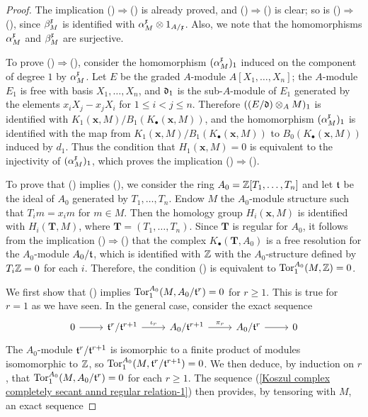 \begin{proof}
The implication ()$\Rightarrow$() is already proved, and ()$\Rightarrow$() is clear; so is ()$\Rightarrow$(), since $\beta_M^{\mathfrak{x}}$ is identified with $\alpha_M^{\mathfrak{x}}\otimes 1_{A/\mathfrak{x}}$. Also, we note that the homomorphisms $\alpha_M^{\mathfrak{x}}$ and $\beta_M^{\mathfrak{x}}$ are surjective.\par
To prove ()$\Rightarrow$(), consider the homomorphism $(\alpha_M^{\mathfrak{x}})_1$ induced on the component of degree $1$ by $\alpha_M^{\mathfrak{x}}$. Let $E$ be the graded $A$-module $A[X_1,\dots,X_n]$; the $A$-module $E_1$ is free with basis $X_1,\dots,X_n$, and $\mathfrak{d}_1$ is the sub-$A$-module of $E_1$ generated by the elements $x_iX_j-x_jX_i$ for $1\leq i<j\leq n$. Therefore $((E/\mathfrak{d})\otimes_AM)_1$ is identified with $K_1(\bm{x},M)/B_1(K_\bullet(\bm{x},M))$, and the homomorphism $(\alpha_M^{\mathfrak{x}})_1$ is identified with the map from $K_1(\bm{x},M)/B_1(K_\bullet(\bm{x},M))$ to $B_0(K_\bullet(\bm{x},M))$ induced by $d_1$. Thus the condition that $H_1(\bm{x},M)=0$ is equivalent to the injectivity of $(\alpha_M^{\mathfrak{x}})_1$, which proves the implication ()$\Rightarrow$().\par
To prove that () implies (), we consider the ring $A_0=\mathbb{Z}[T_1,\dots,T_n]$ and let $\mathfrak{t}$ be the ideal of $A_0$ generated by $T_1,\dots,T_n$. Endow $M$ the $A_0$-module structure such that $T_im=x_im$ for $m\in M$. Then the homology group $H_i(\bm{x},M)$ is identified with $H_i(\bm{T},M)$, where $\bm{T}=(T_1,\dots,T_n)$. Since $\bm{T}$ is regular for $A_0$, it follows from the implication ()$\Rightarrow$() that the complex $K_\bullet(\bm{T},A_0)$ is a free resolution for the $A_0$-module $A_0/\mathfrak{t}$, which is identified with $\mathbb{Z}$ with the $A_0$-structure defined by $T_i\mathbb{Z}=0$ for each $i$. Therefore, the condition () is equivalent to $\mathrm{Tor}_1^{A_0}(M,\mathbb{Z})=0$.\par
We first show that () implies $\mathrm{Tor}_1^{A_0}(M,A_0/\mathfrak{t}^r)=0$ for $r\geq 1$. This is true for $r=1$ as we have seen. In the general case, consider the exact sequence
\begin{equation}\label{Koszul complex completely secant annd regular relation-1}
\begin{tikzcd}
0\ar[r]&\t^r/\t^{r+1}\ar[r,"\iota_r"]&A_0/\t^{r+1}\ar[r,"\pi_r"]&A_0/\t^r\ar[r]&0
\end{tikzcd}
\end{equation}
The $A_0$-module $\mathfrak{t}^r/\mathfrak{t}^{r+1}$ is isomorphic to a finite product of modules isomomorphic to $\mathbb{Z}$, so $\mathrm{Tor}_1^{A_0}(M,\mathfrak{t}^r/\mathfrak{t}^{r+1})=0$. We then deduce, by induction on $r$, that $\mathrm{Tor}_1^{A_0}(M,A_0/\mathfrak{t}^r)=0$ for each $r\geq 1$. The sequence (\ref{Koszul complex completely secant annd regular relation-1}) then provides, by tensoring with $M$, an exact sequence

\end{proof}
